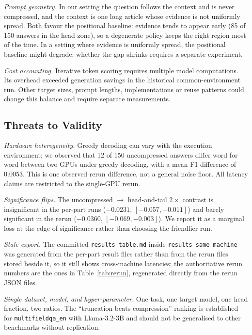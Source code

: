 \documentclass[10pt,a4paper,twocolumn]{article}
\begin{document}
\emph{Prompt geometry.} In our setting the question follows the context and is
never compressed, and the context is one long article whose evidence is not uniformly spread. Both favour the positional baseline: evidence tends to appear
early (85 of 150 answers in the head zone), so a degenerate policy keeps the right
region most of the time. In a setting where evidence is uniformly spread, the positional baseline might degrade; whether the gap shrinks requires a separate experiment.

\emph{Cost accounting.} Iterative token scoring requires multiple model
computations. Its overhead exceeded generation savings in the historical
common-environment run. Other target sizes, prompt lengths, implementations or
reuse patterns could change this balance and require separate measurements.

\subsection{Threats to Validity}

\emph{Hardware heterogeneity.} Greedy decoding can vary with the execution environment;
we observed that 12 of 150 uncompressed answers differ word for word between two
GPUs under greedy decoding, with a mean F1 difference of 0.0053. This is one observed rerun difference, not a general noise floor.
All latency claims are restricted to the single-GPU rerun.

\emph{Significance flips.} The uncompressed $\rightarrow$ head-and-tail $2\times$
contrast is insignificant in the per-part runs ($-0.0231$, $[-0.057,+0.011]$) and
barely significant in the rerun ($-0.0360$, $[-0.069,-0.003]$). We report it as a
marginal loss at the edge of significance rather than choosing the friendlier run.

\emph{Stale export.} The committed \texttt{results\_table.md} inside
\texttt{results\_same\_machine} was generated from the per-part result files
rather than from the rerun files stored beside it, so it still shows cross-machine
latencies; the authoritative rerun numbers are the ones in Table~\ref{tab:rerun},
regenerated directly from the rerun JSON files.

\emph{Single dataset, model, and hyper-parameter.} One task, one target model, one
head fraction, two ratios. The ``truncation beats compression'' ranking is
established for \texttt{multifieldqa\_en} with Llama-3.2-3B and should not be
generalised to other benchmarks without replication.
\end{document}
